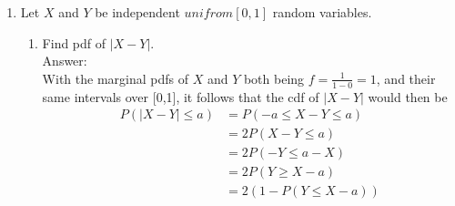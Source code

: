 \documentclass{article}
\begin{document}
\begin{enumerate}
\begin{enumerate}
\begin{align*}
                \end{align*}
            \item   Find $E[Y|X=x]$, for each of $x$ = 1,2,3.
                \begin{align*}
                    E[Y|X=1] &= \sum^{3}_{0} E[Y_i|X=1] = \sum^{3}_{0} Y_i \cdot P(Y_i|X=1) \\
                             &= 0\cdot0 + 1\cdot\frac{1}{10} + 2\cdot\frac{1}{10} + 3\cdot\frac{1}{5} \\
                             &= \frac{1}{10} + \frac{2}{10} + \frac{6}{10} = \frac{9}{10} \\
                    E[Y|X=2] &= \sum^{3}_{0} E[Y_i|X=2] = \sum^{3}_{0} Y_i \cdot P(Y_i|X=1) \\
                             &= 0\cdot0 + 1\cdot\frac{1}{10} + 2\cdot\frac{1}{5} + 3\cdot0 \\
                             &= \frac{1}{10} + \frac{4}{10} = \frac{1}{2} \\
                    E[Y|X=3] &= \sum^{3}_{0} E[Y_i|X=3] = \sum^{3}_{0} Y_i \cdot P(Y_i|X=1) \\
                             &= 0\cdot\frac{1}{10} + 1\cdot\frac{1}{5} + 2\cdot0 + 3\cdot0 \\
                             &= \frac{1}{5} \\
                \end{align*}
        \end{enumerate}
    \clearpage
    \item   Let $X$ and $Y$ be independent $unifrom[0,1]$ random variables.
        \begin{enumerate}
            \item   Find pdf of $|X-Y|$.
                \\Answer:\\
                With the marginal pdfs of $X$ and $Y$ both being $f=\frac{1}{1-0}=1$, and their same intervals over [0,1],
                it follows that the cdf of $|X-Y|$ would then be
                \begin{align*}
                    P(|X-Y|\leq a) &= P(-a\leq X-Y \leq a)\\
                                   &= 2P(X-Y \leq a) \\
                                   &= 2P(-Y \leq a - X) \\
                                   &= 2P(Y \geq X - a) \\
                                   &= 2(1 - P(Y \leq X-a)) \\

\end{align*}
\end{enumerate}
\end{enumerate}
\end{document}

